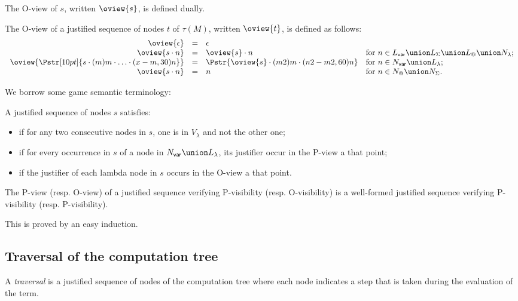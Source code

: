 The O-view of $s$, written $\oview{s}$, is defined dually.
\begin{definition}
\label{dfn:oview} The O-view of a justified sequence of nodes $t$ of
$\tau(M)$, written $\oview{t}$, is defined as follows:
$$\begin{array}{rcll}
 \oview{\epsilon} &=&  \epsilon \\
 \oview{s \cdot n }  &=&  \oview{s} \cdot n
    & \mbox{for $n \in L_{\sf var} \union L_\Sigma \union L_@ \union N_\lambda$;}
    \\
 \oview{\Pstr[10pt]{s \cdot (m){m} \cdot \ldots \cdot (x-m,30){n}}} &=&
    \Pstr{ \oview{s} \cdot (m2){m} \cdot (n2-m2,60){n} }
    & \mbox{for $n \in N_{\sf var} \union L_\lambda$;}
    \\
 \oview{s \cdot n }  &=&  n
    & \mbox{for $n \in N_@ \union N_\Sigma$.}
\end{array}$$
\end{definition}

We borrow some game semantic terminology:
\begin{definition} A justified sequence of nodes $s$ satisfies:
\begin{itemize}[-]
\item {} if for any two consecutive nodes in $s$, one is in $V_\lambda$ and not the other one;
\item {} if for every occurrence in $s$
of a node in $N_{\sf var} \union L_\lambda$, its justifier occur in the P-view a that point;
\item  {} if the justifier of each lambda node in $s$ occurs in the O-view a that point.
\end{itemize}
\end{definition}

\begin{property}
\label{proper:pview_visibility}
The P-view (resp. O-view) of a justified sequence verifying P-visibility (resp. O-visibility)
is a well-formed justified sequence verifying P-visibility (resp. P-visibility).
\end{property}
This is proved by an easy induction.


\subsection{Traversal of the computation tree}
\label{subsec:traversal}
A \emph{traversal} is a justified sequence of nodes of the computation tree where each node indicates a step that is taken during the evaluation of the term.

